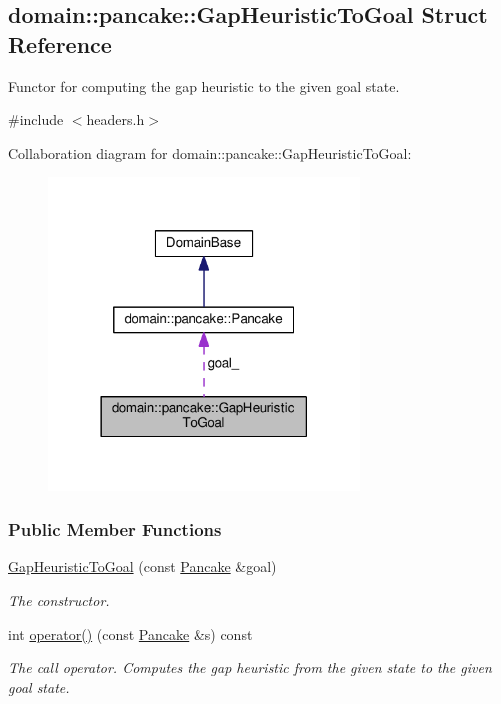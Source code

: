 \hypertarget{structdomain_1_1pancake_1_1GapHeuristicToGoal}{}\subsection{domain\+:\+:pancake\+:\+:Gap\+Heuristic\+To\+Goal Struct Reference}
\label{structdomain_1_1pancake_1_1GapHeuristicToGoal}


Functor for computing the gap heuristic to the given goal state.  




{\ttfamily \#include $<$headers.\+h$>$}



Collaboration diagram for domain\+:\+:pancake\+:\+:Gap\+Heuristic\+To\+Goal\+:\nopagebreak
\begin{figure}[H]
\begin{center}
\leavevmode
\includegraphics[width=234pt]{structdomain_1_1pancake_1_1GapHeuristicToGoal__coll__graph}
\end{center}
\end{figure}
\subsubsection*{Public Member Functions}
\begin{DoxyCompactItemize}
\item 
\hyperlink{structdomain_1_1pancake_1_1GapHeuristicToGoal_a5b22e091663aa8098acac29779ee9c05}{Gap\+Heuristic\+To\+Goal} (const \hyperlink{structdomain_1_1pancake_1_1Pancake}{Pancake} \&goal)
\begin{DoxyCompactList}\small\item\em The constructor. \end{DoxyCompactList}\item 
int \hyperlink{structdomain_1_1pancake_1_1GapHeuristicToGoal_a3f6993f8099802cfaf016511fd70282c}{operator()} (const \hyperlink{structdomain_1_1pancake_1_1Pancake}{Pancake} \&s) const 
\begin{DoxyCompactList}\small\item\em The call operator. Computes the gap heuristic from the given state to the given goal state. \end{DoxyCompactList}\end{DoxyCompactItemize}
